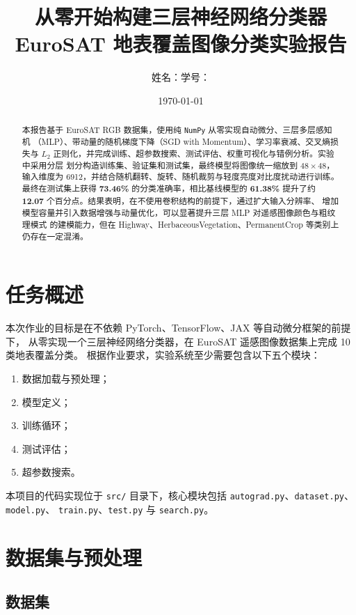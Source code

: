 \documentclass[12pt,a4paper,fontset=none]{ctexart}
\title{从零开始构建三层神经网络分类器\\EuroSAT 地表覆盖图像分类实验报告}
\author{姓名：\StudentName \quad 学号：\StudentID}
\date{\today}
\begin{document}
\maketitle

\begin{abstract}
本报告基于 EuroSAT RGB 数据集，使用纯 \texttt{NumPy} 从零实现自动微分、三层多层感知机
（MLP）、带动量的随机梯度下降（SGD with Momentum）、学习率衰减、交叉熵损失与
$L_2$ 正则化，并完成训练、超参数搜索、测试评估、权重可视化与错例分析。实验中采用分层
划分构造训练集、验证集和测试集，最终模型将图像统一缩放到 $48 \times 48$，输入维度为
6912，并结合随机翻转、旋转、随机裁剪与轻度亮度对比度扰动进行训练。最终在测试集上获得
\textbf{73.46\%} 的分类准确率，相比基线模型的 \textbf{61.38\%} 提升了约
\textbf{12.07} 个百分点。结果表明，在不使用卷积结构的前提下，通过扩大输入分辨率、
增加模型容量并引入数据增强与动量优化，可以显著提升三层 MLP 对遥感图像颜色与粗纹理模式
的建模能力，但在 Highway、HerbaceousVegetation、PermanentCrop 等类别上仍存在一定混淆。
\end{abstract}

\section{任务概述}

本次作业的目标是在不依赖 PyTorch、TensorFlow、JAX 等自动微分框架的前提下，
从零实现一个三层神经网络分类器，在 EuroSAT 遥感图像数据集上完成 10 类地表覆盖分类。
根据作业要求，实验系统至少需要包含以下五个模块：

\begin{enumerate}
    \item 数据加载与预处理；
    \item 模型定义；
    \item 训练循环；
    \item 测试评估；
    \item 超参数搜索。
\end{enumerate}

本项目的代码实现位于 \texttt{src/} 目录下，核心模块包括
\texttt{autograd.py}、\texttt{dataset.py}、\texttt{model.py}、
\texttt{train.py}、\texttt{test.py} 与 \texttt{search.py}。

\section{数据集与预处理}

\subsection{数据集}
\end{document}
